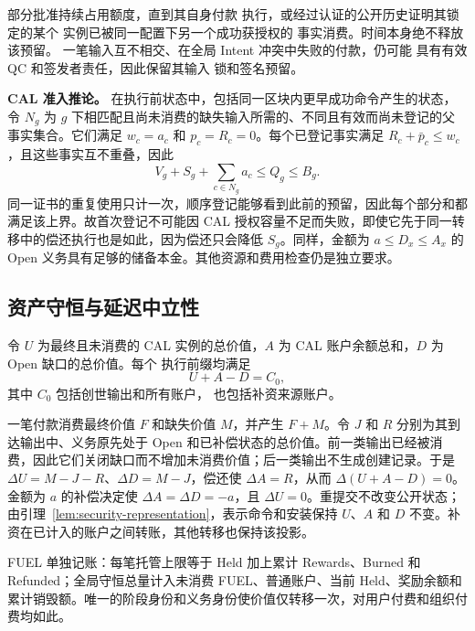 部分批准持续占用额度，直到其自身付款
执行，或经过认证的公开历史证明其锁定的某个
实例已被同一配置下另一个成功获授权的
事实消费。时间本身绝不释放该预留。
一笔输入互不相交、在全局 Intent 冲突中失败的付款，仍可能
具有有效 QC 和签发者责任，因此保留其输入
锁和签名预留。

\noindent\textbf{CAL 准入推论。}
在执行前状态中，包括同一区块内更早成功命令产生的状态，令 $N_g$ 为 $g$ 下相匹配且尚未消费的缺失输入所需的、不同且有效而尚未登记的父事实集合。它们满足 $w_c=a_c$ 和 $p_c=R_c=0$。每个已登记事实满足 $R_c+\bar p_c\le w_c$，且这些事实互不重叠，因此
\begin{equation}
 V_g+S_g+\sum_{c\in N_g}a_c\le Q_g\le B_g.
 \label{eq:security-admission}
\end{equation}
同一证书的重复使用只计一次，顺序登记能够看到此前的预留，因此每个部分和都满足该上界。故首次登记不可能因 CAL 授权容量不足而失败，即使它先于同一转移中的偿还执行也是如此，因为偿还只会降低 $S_g$。同样，金额为 $a\le D_x\le A_x$ 的 Open 义务具有足够的储备本金。其他资源和费用检查仍是独立要求。

\subsection{资产守恒与延迟中立性}
\label{sec:security-conservation}

\begin{theorem}[CAL 守恒]
\label{thm:security-conservation}
令 $U$ 为最终且未消费的 CAL 实例的总价值，$A$ 为
CAL 账户余额总和，$D$ 为 Open 缺口的总价值。每个
执行前缀均满足
\begin{equation}
 U+A-D=C_0,
 \label{eq:security-conservation}
\end{equation}
其中 $C_0$ 包括创世输出和所有账户，
也包括补资来源账户。
\end{theorem}
\begin{IEEEproof}
一笔付款消费最终价值 $F$ 和缺失价值 $M$，并产生 $F+M$。令 $J$ 和 $R$ 分别为其到达输出中、义务原先处于 Open 和已补偿状态的总价值。前一类输出已经被消费，因此它们关闭缺口而不增加未消费价值；后一类输出不生成创建记录。于是 $\Delta U=M-J-R$、$\Delta D=M-J$，偿还使 $\Delta A=R$，从而 $\Delta(U+A-D)=0$。金额为 $a$ 的补偿决定使 $\Delta A=\Delta D=-a$，且 $\Delta U=0$。重提交不改变公开状态；由引理~\ref{lem:security-representation}，表示命令和安装保持 $U$、$A$ 和 $D$ 不变。补资在已计入的账户之间转账，其他转移也保持该投影。
\end{IEEEproof}

FUEL 单独记账：每笔托管上限等于 Held 加上累计 Rewards、Burned 和 Refunded；全局守恒总量计入未消费 FUEL、普通账户、当前 Held、奖励余额和累计销毁额。唯一的阶段身份和义务身份使价值仅转移一次，对用户付费和组织付费均如此。


